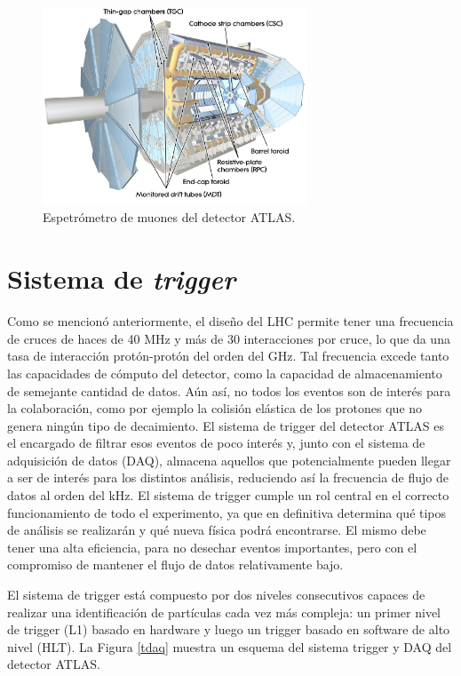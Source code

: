 \begin{figure}
  \centering
  \includegraphics[width=0.7\textwidth]{images/muon_1.jpg}
  \caption{Espetrómetro de muones del detector ATLAS.}
  \label{muon_1}
\end{figure}

\section{Sistema de \textit{trigger}}
\label{trigger}

Como se mencionó anteriormente, el diseño del LHC permite tener una frecuencia de cruces de haces de 40 MHz y más de 30 
interacciones por cruce, lo que da una tasa de interacción protón-protón del orden del GHz. Tal frecuencia excede tanto las capacidades de cómputo del detector, como la capacidad de almacenamiento de semejante cantidad de datos. Aún así, no todos los eventos son de interés para la colaboración, como por ejemplo la colisión elástica de los protones que no genera ningún tipo de decaimiento. El sistema de trigger del detector ATLAS \cite{TRIG-2016-01} es el encargado de filtrar esos eventos de poco interés y, junto con el sistema de adquisición de datos (DAQ), almacena aquellos que potencialmente pueden llegar a ser de interés para los distintos análisis, reduciendo así la frecuencia de flujo de datos al orden del kHz. El sistema de trigger cumple un rol central en el correcto funcionamiento de todo el experimento, ya que en definitiva determina qué tipos de análisis se realizarán y qué nueva física podrá encontrarse. El mismo debe tener una alta eficiencia, para no desechar eventos importantes, pero con el compromiso de mantener el flujo de datos relativamente bajo. 

El sistema de trigger está compuesto por dos niveles consecutivos capaces de realizar una identificación de partículas cada vez más compleja: un primer nivel de trigger (L1) basado en hardware y luego un trigger basado en software de alto nivel (HLT). La Figura \ref{tdaq} muestra un esquema del sistema trigger y DAQ del detector ATLAS.

